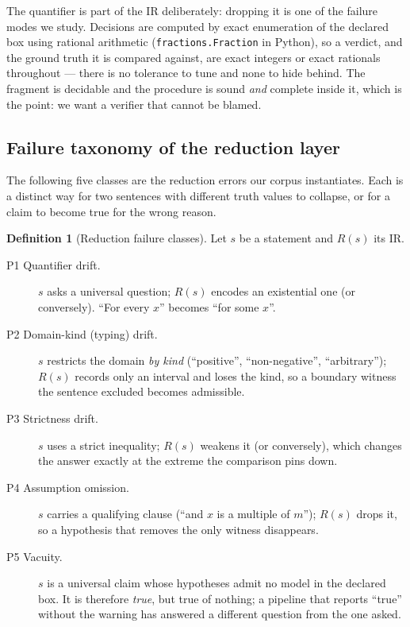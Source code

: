 \documentclass[11pt]{article}
\theoremstyle{definition}
\newtheorem{definition}{Definition}
\begin{document}
The quantifier is part of the IR deliberately: dropping it is one of the failure
modes we study. Decisions are computed by exact enumeration of the declared box
using rational arithmetic (\texttt{fractions.Fraction} in Python), so a verdict,
and the ground truth it is compared against, are exact integers or exact
rationals throughout --- there is no tolerance to tune and none to hide behind.
The fragment is decidable and the procedure is sound \emph{and} complete inside
it, which is the point: we want a verifier that cannot be blamed.

\subsection{Failure taxonomy of the reduction layer}
\label{sec:taxonomy}

The following five classes are the reduction errors our corpus instantiates.
Each is a distinct way for two sentences with different truth values to
collapse, or for a claim to become true for the wrong reason.

\begin{definition}[Reduction failure classes]
\label{def:taxonomy}
Let $s$ be a statement and $R(s)$ its IR.
\begin{description}
  \item[P1 Quantifier drift.] $s$ asks a universal question; $R(s)$ encodes an
        existential one (or conversely). ``For every $x$'' becomes ``for some
        $x$''.
  \item[P2 Domain-kind (typing) drift.] $s$ restricts the domain \emph{by kind}
        (``positive'', ``non-negative'', ``arbitrary''); $R(s)$ records only an
        interval and loses the kind, so a boundary witness the sentence excluded
        becomes admissible.
  \item[P3 Strictness drift.] $s$ uses a strict inequality; $R(s)$ weakens it
        (or conversely), which changes the answer exactly at the extreme the
        comparison pins down.
  \item[P4 Assumption omission.] $s$ carries a qualifying clause (``and $x$ is a
        multiple of $m$''); $R(s)$ drops it, so a hypothesis that removes the only
        witness disappears.
  \item[P5 Vacuity.] $s$ is a universal claim whose hypotheses admit no model in
        the declared box. It is therefore \emph{true}, but true of nothing; a
        pipeline that reports ``true'' without the warning has answered a
        different question from the one asked.
\end{description}
\end{definition}
\end{document}

